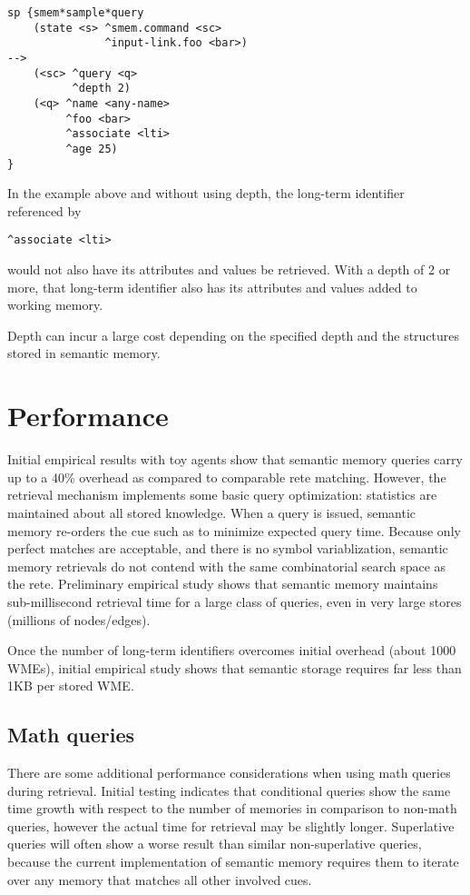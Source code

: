 \begin{verbatim}
sp {smem*sample*query
    (state <s> ^smem.command <sc>
               ^input-link.foo <bar>)
-->
    (<sc> ^query <q>
          ^depth 2)
    (<q> ^name <any-name>
         ^foo <bar>
         ^associate <lti>
         ^age 25)
}
\end{verbatim}

In the example above and without using depth, the long-term identifier referenced by
\begin{verbatim}
^associate <lti>
\end{verbatim}
would not also have its attributes and values be retrieved. With a depth of 2 or more, that long-term identifier also has its attributes and values added to working memory.

Depth can incur a large cost depending on the specified depth and the structures stored in semantic memory.

\section{Performance}
\label{SMEM-perf}

Initial empirical results with toy agents show that semantic memory queries carry up to a 40\% overhead as compared to comparable rete matching.
However, the retrieval mechanism implements some basic query optimization: statistics are maintained about all stored knowledge.
When a query is issued, semantic memory re-orders the cue such as to minimize expected query time.
Because only perfect matches are acceptable, and there is no symbol variablization, semantic memory retrievals do not contend with the same combinatorial search space as the rete.
Preliminary empirical study shows that semantic memory maintains sub-millisecond retrieval time for a large class of queries, even in very large stores (millions of nodes/edges).

Once the number of long-term identifiers overcomes initial overhead (about 1000 WMEs), initial empirical study shows that semantic storage requires far less than 1KB per stored WME.

\subsection{Math queries}
There are some additional performance considerations when using math queries during retrieval.
Initial testing indicates that conditional queries show the same time growth with respect to the number of memories in comparison to non-math queries, however the actual time for retrieval may be slightly longer.
Superlative queries will often show a worse result than similar non-superlative queries, because the current implementation of semantic memory requires them to iterate over any memory that matches all other involved cues.


